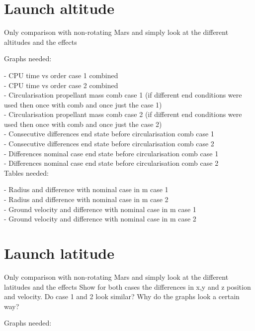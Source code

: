 \section{Launch altitude}
\label{sec:launchAltitude}

Only comparison with non-rotating Mars and simply look at the different altitudes and the effects

Graphs needed:

- CPU time vs order case 1 combined \\
- CPU time vs order case 2 combined \\
- Circularisation propellant mass comb case 1 (if different end conditions were used then once with comb and once just the case 1) \\
- Circularisation propellant mass comb case 2 (if different end conditions were used then once with comb and once just the case 2) \\
- Consecutive differences end state before circularisation comb case 1 \\
- Consecutive differences end state before circularisation comb case 2 \\
- Differences nominal case end state before circularisation comb case 1 \\
- Differences nominal case end state before circularisation comb case 2 \\


Tables needed:

- Radius and difference with nominal case in m case 1 \\
- Radius and difference with nominal case in m case 2 \\
- Ground velocity and difference with nominal case in m case 1 \\
- Ground velocity and difference with nominal case in m case 2 \\





\section{Launch latitude}
\label{sec:launchLatitude}

Only comparison with non-rotating Mars and simply look at the different latitudes and the effects
Show for both cases the differences in x,y and z position and velocity. Do case 1 and 2 look similar? Why do the graphs look a certain way?

Graphs needed:

